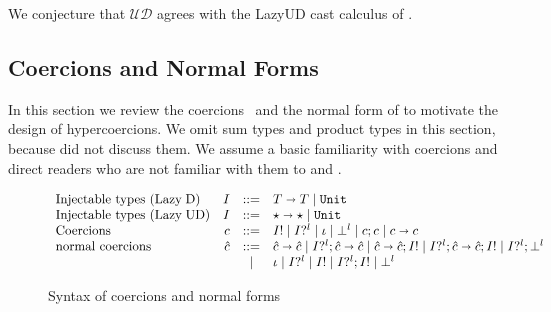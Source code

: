 \documentclass[acmsmall,review,anonymous]{acmart}\settopmatter{printfolios=true,printccs=false,printacmref=false}
\newcommand{\stxrule}[3]{\text{#2} & #1 & ::= & #3\\}
\newcommand{\stxrulecont}[1]{& & | & #1 \\}
\newcommand{\plus}[0]{+}
\newcommand{\lazyUD}{Lazy\;UD}
\newcommand{\lazyD}{Lazy\;D}
\newcommand{\TOOdyn}[0]{\star}
\newcommand{\POOunit}[0]{\mathtt{Unit}}
\newcommand{\POOfun}[2]{#1 \shortrightarrow #2}
\newcommand{\POOprod}[2]{#1 \times #2}
\newcommand{\POOsum}[2]{#1 \plus #2}
\newcommand{\ncProj}[2]{#1?^{#2}}
\newcommand{\ncInj}[1]{#1!}
\newcommand{\ncId}[0]{\iota}
\newcommand{\ncSeq}[2]{#1;#2}
\newcommand{\ncFail}[1]{\bot^{#1}}
\newcommand{\ncFun}[2]{\POOfun{#1}{#2}}
\newcommand{\ncProd}[2]{\POOprod{#1}{#2}}
\newcommand{\ncSum}[2]{\POOsum{#1}{#2}}
\newcommand{\ineffCEKUD}{$\mathcal{UD}$}
\begin{document}
We conjecture that \ineffCEKUD{} agrees with the \lazyUD{} cast
calculus of \citet{siek2009exploring}.

\subsection{Coercions and Normal Forms} 
\label{sec:coercion-calculus}

In this section we review the
coercions~\citep{henglein1994dynamic,herman2010space} and the normal
form of \citet{siek2012interpretations} to motivate the design of
hypercoercions.  We omit sum types and product types in this section,
because \citet{siek2012interpretations} did not discuss them. We
assume a basic familiarity with coercions and direct readers who are
not familiar with them to \citet{siek2012interpretations} and
\citet{siek2015blame}.

\begin{figure}
  \[
  \begin{array}{lrcl}
  \stxrule{I}{Injectable types (\lazyD)}{
    \POOfun{T}{T} \mid \POOunit}
  \stxrule{I}{Injectable types (\lazyUD)}{
    \POOfun{\TOOdyn}{\TOOdyn} \mid \POOunit
  }
  \stxrule{c}{Coercions}{
    \ncInj{I} \mid
    \ncProj{I}{l} \mid
    \ncId \mid
    \ncFail{l} \mid
    \ncSeq{c}{c} \mid
    \ncFun{c}{c}
  }
\stxrule{\hat{c}}{normal coercions}{
  \ncFun{\hat{c}}{\hat{c}} \mid
  \ncSeq{\ncProj{I}{l}}{\ncFun{\hat{c}}{\hat{c}}} \mid
  \ncSeq{\ncFun{\hat{c}}{\hat{c}}}{\ncInj{I}} \mid
  \ncSeq{\ncProj{I}{l}}{\ncSeq{\ncFun{\hat{c}}{\hat{c}}}{\ncInj{I}}} \mid
  \ncSeq{\ncProj{I}{l}}{\ncFail{l}}
}
\stxrulecont{
  \ncId \mid
  \ncProj{I}{l} \mid
  \ncInj{I} \mid
  \ncSeq{\ncProj{I}{l}}{\ncInj{I}} \mid
  \ncFail{l} 
}
  \end{array}
  \]
  \caption{Syntax of coercions and normal forms}
  \label{fig:normal-coercion}
\end{figure}
\end{document}
